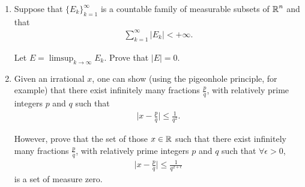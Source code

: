 \documentclass[UTF8,a4paper,10pt]{article}
\begin{document}
\begin{mybox}{}


\end{mybox}
  

  \begin{Problem}[]{
    }

    \begin{enumerate}[label=(\alph*)]
      \item     
      Suppose that \(\{E_k\}_{k=1}^{\infty}\) is a countable family of measurable subsets of \(\operatorname{\mathbb{R}}^n\) and that
      \begin{equation*}
        \begin{aligned}
          \sum_{k=1}^{\infty}|E_k|<+\infty.
        \end{aligned}
      \end{equation*}

      Let \(E = \limsup_{k\to\infty}E_k\). Prove that \(|E| = 0\).
      \item 
      Given an irrational \(x\), one can show (using the pigeonhole principle, for example) that there exist infinitely many fractions \(\frac{p}{q}\), with relatively prime integers \(p\) and \(q\) such that 
      \begin{equation*}
        \begin{aligned}
          \bigg| x-\frac{p}{q} \bigg|\leq\frac{1}{q^2}.
        \end{aligned}
      \end{equation*}

    However, prove that the set of those \(x\in \operatorname{\mathbb{R}}\) such that there exist infinitely many fractions \(\frac{p}{q}\), with relatively prime integers \(p\) and \(q\) such that 
    \(\forall\epsilon > 0\), 
    \begin{equation*}
      \begin{aligned}
        \bigg| x-\frac{p}{q} \bigg|\leq\frac{1}{q^{2+\epsilon}}
      \end{aligned}
    \end{equation*}
    is a set of measure zero.

    \end{enumerate}  
  \end{Problem}

  \begin{solution}\,



  \end{solution}

\end{document}
